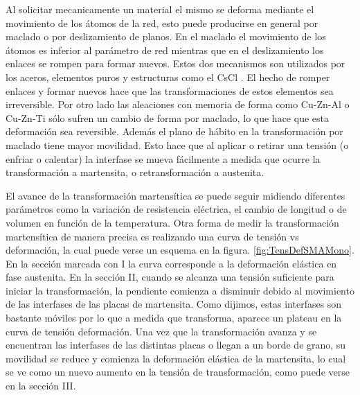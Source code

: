 \documentclass[a4paper,12pt,fleqn,twoside,openany]{book}
\begin{document}
Al solicitar mecanicamente un material el mismo se deforma mediante el movimiento de los átomos de la red, esto puede producirse en general por maclado o por deslizamiento de planos. En el maclado el movimiento de los átomos es inferior al parámetro de red mientras que en el deslizamiento los enlaces se rompen para formar nuevos. 
Estos dos mecanismos son utilizados por los aceros, 
elementos puros y estructuras como el CsCl \cite{duering, elliott}. El hecho de romper enlaces y formar nuevos hace que las transformaciones de estos 
elementos sea irreversible. Por otro lado las aleaciones con memoria de forma como Cu-Zn-Al o Cu-Zn-Ti sólo sufren un cambio de forma por maclado, lo que hace que esta deformación sea reversible. Además el plano de hábito en la transformación por maclado tiene mayor movilidad. Esto hace que al aplicar o retirar una tensión (o enfriar o calentar) la interfase se mueva fácilmente a medida que ocurre la transformación a martensita, o retransformación a austenita.










El avance de la transformación martensítica se puede seguir midiendo diferentes parámetros como la variación de resistencia eléctrica, 
el cambio de longitud o de volumen en función de la temperatura. Otra forma de medir la transformación martensítica de manera precisa es realizando 
una curva de tensión vs deformación, la cual puede verse un esquema en la figura. \ref{fig:TensDefSMAMono}. En la sección marcada con I la curva 
corresponde a la deformación elástica en fase austenita. En la sección II, cuando se alcanza una tensión 
suficiente para iniciar la transformación, la pendiente comienza a disminuir debido al movimiento de las interfases de las placas de martensita. 
Como dijimos, estas interfases son bastante móviles por lo que a medida que transforma, aparece un plateau en la curva de tensión deformación. 
Una vez que la transformación avanza y se encuentran las interfases de las distintas placas o llegan a un borde de grano, su movilidad se reduce y 
comienza la deformación elástica de la martensita, lo cual se ve como un nuevo aumento en la tensión de transformación, como puede verse en la sección III. 
\end{document}
